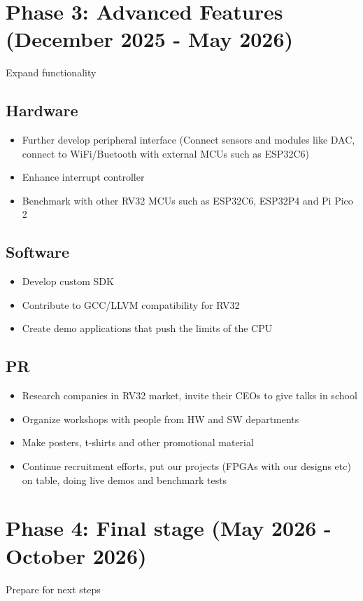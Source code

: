 \documentclass{article}
\begin{document}
\section{Phase 3: Advanced Features (December 2025 - May 2026)}
Expand functionality

\subsection{Hardware}
\begin{itemize}
    \item Further develop peripheral interface (Connect sensors and modules like DAC, connect to WiFi/Buetooth with external MCUs such as ESP32C6)
    \item Enhance interrupt controller
    \item Benchmark with other RV32 MCUs such as ESP32C6, ESP32P4 and Pi Pico 2
\end{itemize}

\subsection{Software}
\begin{itemize}
    \item Develop custom SDK
    \item Contribute to GCC/LLVM compatibility for RV32
    \item Create demo applications that push the limits of the CPU
\end{itemize}

\subsection{PR}
\begin{itemize}
    \item Research companies in RV32 market, invite their CEOs to give talks in school
    \item Organize workshops with people from HW and SW departments
    \item Make posters, t-shirts and other promotional material
    \item Continue recruitment efforts, put our projects (FPGAs with our designs etc) on table, doing live demos and benchmark tests
\end{itemize}

\section{Phase 4: Final stage (May 2026 - October 2026)}
Prepare for next steps
\end{document}
